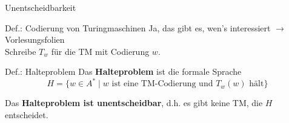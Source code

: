 \begin{frame}{Unentscheidbarkeit}
    \begin{block}{Def.: Codierung von Turingmaschinen}
    	Ja, das gibt es, wen's interessiert $\rightarrow$ Vorlesungsfolien\\
    	Schreibe $T_w$ für die TM mit Codierung $w$.
    \end{block}
\pause
    \begin{block}{Def.: Halteproblem}
    	Das \textbf{Halteproblem} ist die formale Sprache
    	\[
			H = \{ w\in A^* \mid \text{$w$ ist eine TM-Codierung und $T_w(w)$ hält} \}
		\]

		Das \textbf{Halteproblem ist unentscheidbar}, d.h. es gibt keine TM, die $H$ entscheidet.
    \end{block}
\end{frame}